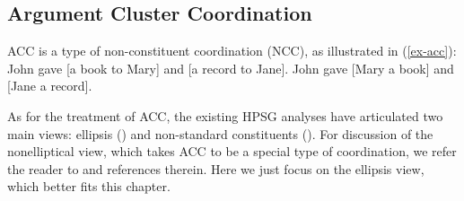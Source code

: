\iffalse{
To illustrate, an \ili{English} verb form mismatch is depicted in (\ref{verbform}), from \citep[see][5]{Shiraishi2019}, where the left conjunct requires a participle while the shared material contains an infinitive form of the verb \textit{appear}.

\ea Some new hybrid models already have, and others soon will appear in the automobile industry.\label{verbform}

\citep{Shiraishi2019} capture verb form mismatch of this kind by introducing into their analysis of RNR the feature LID, which carries lexeme identity information. That is, this feature ensures semantic and syntactic category identity but ignores differences introduced by inflectional suffixes, with the result that the participle and the infinitive in (\ref{verbform}) count as lexeme-identical. RNR is licensed by including the LID feature in the MP feature also used in \citet{Chaves2014} (see (\ref{bpd})).
}\fi


\subsection{Argument Cluster Coordination}

ACC is a type of non-constituent coordination (NCC), as
illustrated in (\ref{ex-acc}):
%
%
\eal
\label{ex-acc}
\ex John gave [a book to Mary] and [a record to Jane].   \label{acc-here}
\ex John gave [Mary a book] and [Jane a record].  \label{acc-1}
\zl
%
%

As for the treatment of ACC, the existing HPSG analyses have articulated two main views: ellipsis
(\citealt{Yatabe2001, Crysmann2003, Beavers2004}) and non-standard constituents (\citealt{Mouret2006}). For discussion of
the nonelliptical view, which takes ACC to be a special type of coordination,
we refer the reader to  and references 
therein. Here we just focus on the ellipsis view, which better fits this chapter.

